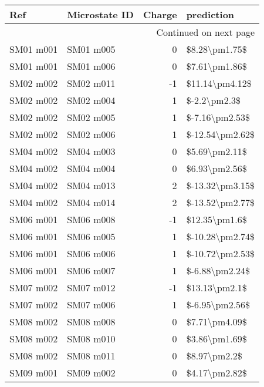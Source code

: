 \begin{longtable}{llrl}
\toprule
       Ref & Microstate ID &  Charge &       prediction \\
\midrule
\endhead
\midrule
\multicolumn{4}{r}{{Continued on next page}} \\
\midrule
\endfoot

\bottomrule
\endlastfoot
 SM01 m001 &     SM01 m005 &       0 &    \$8.28\textbackslash pm1.75\$ \\
 SM01 m001 &     SM01 m006 &       0 &    \$7.61\textbackslash pm1.86\$ \\
 SM02 m002 &     SM02 m011 &      -1 &   \$11.14\textbackslash pm4.12\$ \\
 SM02 m002 &     SM02 m004 &       1 &     \$-2.2\textbackslash pm2.3\$ \\
 SM02 m002 &     SM02 m005 &       1 &   \$-7.16\textbackslash pm2.53\$ \\
 SM02 m002 &     SM02 m006 &       1 &  \$-12.54\textbackslash pm2.62\$ \\
 SM04 m002 &     SM04 m003 &       0 &    \$5.69\textbackslash pm2.11\$ \\
 SM04 m002 &     SM04 m004 &       0 &    \$6.93\textbackslash pm2.56\$ \\
 SM04 m002 &     SM04 m013 &       2 &  \$-13.32\textbackslash pm3.15\$ \\
 SM04 m002 &     SM04 m014 &       2 &  \$-13.52\textbackslash pm2.77\$ \\
 SM06 m001 &     SM06 m008 &      -1 &    \$12.35\textbackslash pm1.6\$ \\
 SM06 m001 &     SM06 m005 &       1 &  \$-10.28\textbackslash pm2.74\$ \\
 SM06 m001 &     SM06 m006 &       1 &  \$-10.72\textbackslash pm2.53\$ \\
 SM06 m001 &     SM06 m007 &       1 &   \$-6.88\textbackslash pm2.24\$ \\
 SM07 m002 &     SM07 m012 &      -1 &    \$13.13\textbackslash pm2.1\$ \\
 SM07 m002 &     SM07 m006 &       1 &   \$-6.95\textbackslash pm2.56\$ \\
 SM08 m002 &     SM08 m008 &       0 &    \$7.71\textbackslash pm4.09\$ \\
 SM08 m002 &     SM08 m010 &       0 &    \$3.86\textbackslash pm1.69\$ \\
 SM08 m002 &     SM08 m011 &       0 &     \$8.97\textbackslash pm2.2\$ \\
 SM09 m001 &     SM09 m002 &       0 &    \$4.17\textbackslash pm2.82\$ \\

\end{longtable}
